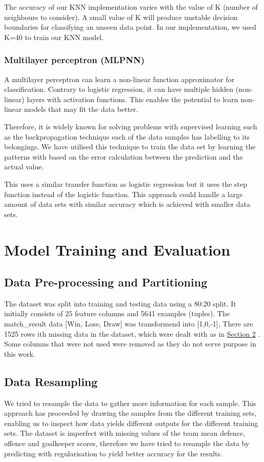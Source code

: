 \documentclass[8pt]{article}
\begin{document}
The accuracy of our KNN implementation varies with the value of K (number of neighbours to consider). A small value of K will produce unstable decision boundaries for classifying an unseen data point. In our implementation, we used K=40 to train our KNN model.

\subsubsection{Multilayer perceptron (MLPNN)}
A multilayer perceptron can learn a non-linear function approximator for classification. Contrary to logistic regression, it can have multiple hidden (non-linear) layers with activation functions. This enables the potential to learn non-linear models that may fit the data better.

Therefore, it is widely known for solving problems with supervised learning such as the backpropagation technique each of the data samples has labelling to its belongings. We have utilised this technique to train the data set by learning the patterns with based on the error calculation between the prediction and the actual value.

This uses a similar transfer function as logistic regression but it uses the step function instead of the logistic function. This approach could handle a large amount of data sets with similar accuracy which is achieved with smaller data sets.

\section{Model Training and Evaluation}
\subsection{Data Pre-processing and Partitioning}

The dataset was split into training and testing data using a 80:20 split. It initially consists of 25 feature columns and 5641 examples (tuples). The match\_result data [Win, Lose, Draw] was transformend into [1,0,-1], There are 1525 rows ith missing data in the dataset, which were dealt with as in \hyperref[sec:exploration]{Section 2} . Some columns that were not used were removed as they do not serve purpose in this work.

\subsection{Data Resampling}
We tried to resample the data to gather more information for each sample. This approach has proceeded by drawing the samples from the different training sets, enabling us to inspect how data yields different outputs for the different training sets.
The dataset is imperfect with missing values of the team mean defence, offence and goalkeeper scores, therefore we have tried to resample the data by predicting with regularisation to yield better accuracy for the results.
\end{document}
